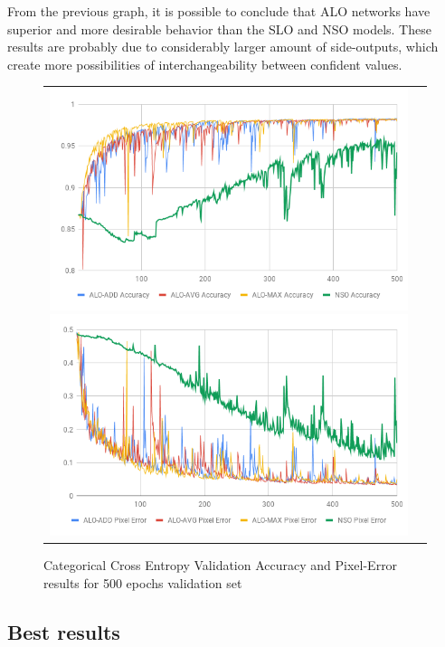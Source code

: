 From the previous graph, it is possible to conclude that ALO networks have superior and more desirable behavior than the SLO and NSO models. These results are probably due to considerably larger amount of side-outputs, which create more possibilities of interchangeability between confident values.

\begin{figure}
  \caption{Categorical Cross Entropy Validation Accuracy and Pixel-Error results for 500 epochs validation set}
  \centering
  \begin{tabular}{ll}
    \includegraphics[width=1.\columnwidth]{figures/falreis/val_acc_500_epochs.png}
  
    \includegraphics[width=1.\columnwidth]{figures/falreis/pixel_error_500_epochs.png}
  \end{tabular}%
  \label{fig:val_acc_500_epochs}
\end{figure}

\subsection{Best results}

